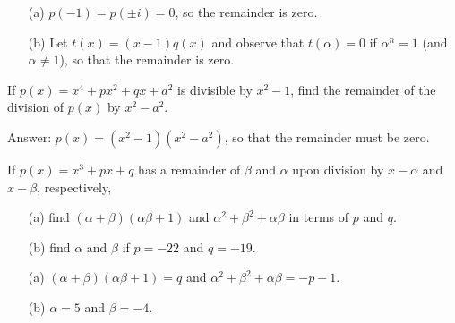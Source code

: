 \documentclass[12pt,a4paper]{memoir}
\theoremstyle{definition}
\begin{document}
\begin{solution}[name=Solution by Parviz Shahriari]
	\begin{itemize}
		\item[(a)] $p(-1)=p(\pm i) = 0$, so the remainder is zero.
		\item[(b)] Let $t(x)=(x-1)q(x)$ and observe that $t(\alpha)=0$ if $\alpha^n=1$ (and $\alpha \neq 1$), so that the remainder is zero.
	\end{itemize}
\end{solution}




\begin{tcolorbox}
	\begin{question}
		If $p(x)=x^4+px^2+qx+a^2$ is divisible by $x^2-1$, find the remainder of the division of $p(x)$ by $x^2-a^2$.
	\end{question}
\end{tcolorbox}

\begin{solution}[name=Solution by Parviz Shahriari]
	Answer: $p(x)=(x^2-1)(x^2-a^2)$, so that the remainder must be zero.
\end{solution}



\begin{tcolorbox}
	\begin{question}
		If $p(x)=x^3+px+q$ has a remainder of $\beta$ and $\alpha$ upon division by $x-\alpha$ and $x-\beta$, respectively,
		\begin{itemize}
			\item[(a)] find $(\alpha+\beta)(\alpha\beta+1)$ and $\alpha^2+\beta^2+\alpha\beta$ in terms of $p$ and $q$.
			\item[(b)] find $\alpha$ and $\beta$ if $p=-22$ and $q=-19$.
		\end{itemize}
	\end{question}
\end{tcolorbox}

\begin{solution}[name=Solution by Parviz Shahriari]
	\begin{itemize}
		\item[(a)] $(\alpha+\beta)(\alpha\beta+1)=q$ and $\alpha^2+\beta^2+\alpha\beta=-p-1$.
		\item[(b)] $\alpha=5$ and $\beta=-4$.
	\end{itemize}
\end{solution}
\end{document}
